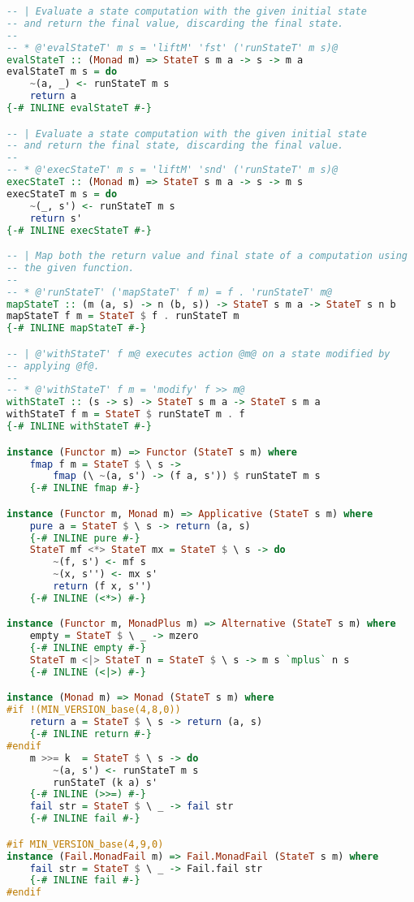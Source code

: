 \begin{lstlisting}[language=Haskell]
-- | Evaluate a state computation with the given initial state
-- and return the final value, discarding the final state.
--
-- * @'evalStateT' m s = 'liftM' 'fst' ('runStateT' m s)@
evalStateT :: (Monad m) => StateT s m a -> s -> m a
evalStateT m s = do
    ~(a, _) <- runStateT m s
    return a
{-# INLINE evalStateT #-}

-- | Evaluate a state computation with the given initial state
-- and return the final state, discarding the final value.
--
-- * @'execStateT' m s = 'liftM' 'snd' ('runStateT' m s)@
execStateT :: (Monad m) => StateT s m a -> s -> m s
execStateT m s = do
    ~(_, s') <- runStateT m s
    return s'
{-# INLINE execStateT #-}

-- | Map both the return value and final state of a computation using
-- the given function.
--
-- * @'runStateT' ('mapStateT' f m) = f . 'runStateT' m@
mapStateT :: (m (a, s) -> n (b, s)) -> StateT s m a -> StateT s n b
mapStateT f m = StateT $ f . runStateT m
{-# INLINE mapStateT #-}

-- | @'withStateT' f m@ executes action @m@ on a state modified by
-- applying @f@.
--
-- * @'withStateT' f m = 'modify' f >> m@
withStateT :: (s -> s) -> StateT s m a -> StateT s m a
withStateT f m = StateT $ runStateT m . f
{-# INLINE withStateT #-}

instance (Functor m) => Functor (StateT s m) where
    fmap f m = StateT $ \ s ->
        fmap (\ ~(a, s') -> (f a, s')) $ runStateT m s
    {-# INLINE fmap #-}

instance (Functor m, Monad m) => Applicative (StateT s m) where
    pure a = StateT $ \ s -> return (a, s)
    {-# INLINE pure #-}
    StateT mf <*> StateT mx = StateT $ \ s -> do
        ~(f, s') <- mf s
        ~(x, s'') <- mx s'
        return (f x, s'')
    {-# INLINE (<*>) #-}

instance (Functor m, MonadPlus m) => Alternative (StateT s m) where
    empty = StateT $ \ _ -> mzero
    {-# INLINE empty #-}
    StateT m <|> StateT n = StateT $ \ s -> m s `mplus` n s
    {-# INLINE (<|>) #-}

instance (Monad m) => Monad (StateT s m) where
#if !(MIN_VERSION_base(4,8,0))
    return a = StateT $ \ s -> return (a, s)
    {-# INLINE return #-}
#endif
    m >>= k  = StateT $ \ s -> do
        ~(a, s') <- runStateT m s
        runStateT (k a) s'
    {-# INLINE (>>=) #-}
    fail str = StateT $ \ _ -> fail str
    {-# INLINE fail #-}

#if MIN_VERSION_base(4,9,0)
instance (Fail.MonadFail m) => Fail.MonadFail (StateT s m) where
    fail str = StateT $ \ _ -> Fail.fail str
    {-# INLINE fail #-}
#endif


\end{lstlisting}
